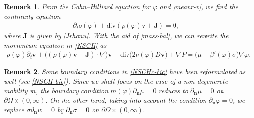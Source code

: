 \documentclass[11pt,reqno]{amsart}
\newtheorem{remark}{\textbf{Remark}}[section]
\def\n{{\bm{n}}}
\def\div{\mathrm{div}}
\def\J{\mathbf{J}}
\def\vv{\bm{v}}
\begin{document}
%
\begin{remark}\rm
\label{rem:NS-2}
From the Cahn--Hilliard equation for $\varphi$ and \eqref{meanr-v}, we find the continuity equation
%
\begin{align}
 \partial_t \rho(\varphi) + \div( \rho(\varphi) \vv+ \J )=0,
 \label{mass-bal}
\end{align}
%
where $\J$ is given by \eqref{Jrhonu}.
With the aid of \eqref{mass-bal}, we can rewrite the momentum equation in \eqref{NSCH} as
%
\begin{align}
\rho(\varphi)\partial_t \vv +  \big(( \rho(\varphi) \vv + \J) \cdot\nabla \big)\vv - \div \big( 2\nu(\varphi) D \vv \big) + \nabla P = \big(\mu-\beta'(\varphi)  \sigma\big) \nabla \varphi.
\label{mome-new}
\end{align}
%
\end{remark}
%
\begin{remark}\rm
Some boundary conditions in \eqref{NSCHc-bic} have been reformulated as well (see \eqref{NSCH-bic}). Since we shall focus on the case of a non-degenerate mobility $m$, the boundary condition $m(\varphi)\partial_\n \mu=0$ reduces to $\partial_\n \mu=0$ on $\partial \Omega\times (0,\infty)$. On the other hand, taking into account the condition $\partial_\n \varphi=0$, we replace $\sigma\partial_\n w=0$ by $\partial_\n \sigma =0$ on $\partial \Omega\times (0,\infty)$.
\end{remark}
\end{document}
